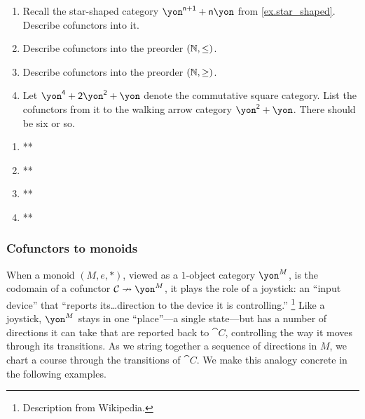 \documentclass[Book-Poly]{subfiles}
\begin{document}
\begin{exercise}
\begin{enumerate}
	\item Recall the star-shaped category ${\yon}^{\ord{n}+\1}+\ord{n}\yon$ from \cref{ex.star_shaped}. Describe cofunctors into it.
	\item Describe cofunctors into the preorder $(\mathbb{N},\leq)$.
	\item Describe cofunctors into the preorder $(\mathbb{N},\geq)$.
	\item Let $\yon^\4+\2\yon^\2+\yon$ denote the commutative square category. List the cofunctors from it to the walking arrow category $\yon^\2+\yon$.
	There should be six or so.
\qedhere
\end{enumerate}
\begin{solution}
\begin{enumerate}
    \item **
    \item **
    \item **
    \item **
\end{enumerate}
\end{solution}
\end{exercise}

\subsubsection{Cofunctors to monoids}

When a monoid $(M,e,*)$, viewed as a $1$-object category $\yon^M$, is the codomain of a cofunctor $\cat{C}\cof\yon^M$, it plays the role of a joystick: an ``input device'' that ``reports its\dots direction to the device it is controlling.''%
\footnote{Description from Wikipedia.} %
Like a joystick, $\yon^M$ stays in one ``place''---a single state---but has a number of directions it can take that are reported back to $\cat{C}$, controlling the way it moves through its transitions.
As we string together a sequence of directions in $M$, we chart a course through the transitions of $\cat C$.
We make this analogy concrete in the following examples.
\end{document}
